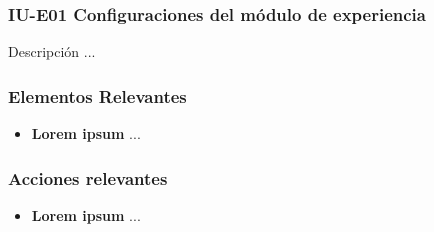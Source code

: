 
\subsubsection{IU-E01 Configuraciones del módulo de experiencia}

 Descripción ...


\subsubsection{Elementos Relevantes}

    \begin{itemize}
    \item {\bf Lorem ipsum}
        ...
    \end{itemize}

\subsubsection{Acciones relevantes}

    \begin{itemize}
    \item {\bf Lorem ipsum}
        ...
    \end{itemize}

\clearpage
